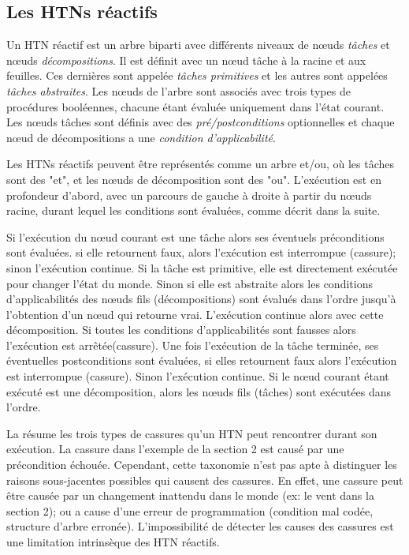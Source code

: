 \documentclass[a4paper,twoside,french]{article}
\begin{document}
		\subsection{Les HTNs réactifs}
		Un HTN réactif est un arbre biparti avec  différents niveaux de  n\oe uds {\em tâches} et   n\oe uds {\em décompositions}. Il est définit avec un n\oe ud tâche à la racine et aux feuilles. Ces dernières sont appelée {\em tâches primitives} et les autres sont appelées {\em tâches abstraites}. Les n\oe uds de l'arbre sont associés avec trois types de procédures booléennes, chacune étant évaluée uniquement dans l'état courant. Les nœuds tâches sont définis avec des {\em pré/postconditions} optionnelles et chaque nœud de décompositions a une {\em condition d'applicabilité}.
		\par Les HTNs réactifs peuvent être représentés comme un arbre et/ou, où les tâches sont des "et", et les nœuds de décomposition sont des "ou". L'exécution est en profondeur d'abord, avec un parcours de gauche à droite à partir du nœuds racine, durant lequel les conditions sont évaluées, comme décrit dans la suite. 
		\par Si l'exécution du nœud courant est une tâche alors ses éventuels préconditions sont évaluées. si elle retournent faux, alors l'exécution est interrompue (cassure); sinon l'exécution continue. Si la tâche est primitive, elle est directement exécutée pour changer l'état du monde. Sinon si elle est abstraite alors les conditions d'applicabilités des nœuds fils (décompositions) sont évalués dans l'ordre jusqu'à l'obtention d'un nœud qui retourne vrai. L'exécution continue alors avec cette décomposition. Si toutes les conditions d'applicabilités sont fausses alors  l'exécution est arrêtée(cassure). Une fois l'exécution de la tâche terminée, ses éventuelles postconditions sont évaluées, si elles retournent faux alors l'exécution est interrompue (cassure). Sinon l'exécution continue. Si le nœud courant étant exécuté est une décomposition, alors les nœuds fils (tâches) sont exécutées dans l'ordre. 
		\par La  résume les trois types de cassures qu'un HTN peut rencontrer durant son exécution. La cassure dans l'exemple de la section 2 est causé par une précondition échouée. Cependant, cette taxonomie n'est pas apte à distinguer les raisons sous-jacentes possibles qui causent des cassures. En effet, une cassure peut être causée par un changement inattendu dans le monde (ex: le vent dans la section 2); ou a cause d'une erreur de programmation (condition mal codée, structure d'arbre erronée). L'impossibilité de détecter les causes des cassures est une limitation intrinsèque des HTN réactifs.
		
\end{document}
